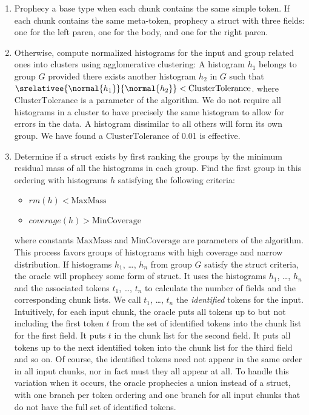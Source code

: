 \begin {enumerate}
\item Prophecy a base type when each chunk contains the same simple
  token. If each chunk contains the same meta-token, prophecy a struct
  with three fields: one for the left paren, one for the body, and one
  for the right paren.

\item Otherwise, compute normalized histograms for the input and group
  related ones into clusters using agglomerative clustering:  A
  histogram $h_1$ belongs to group $G$ provided there exists another
  histogram $h_2$ in $G$ such  that
  $\srelativee{\normal{h_1}}{\normal{h_2}} <  \mathrm{ClusterTolerance}$.  
  where $\mathrm{ClusterTolerance}$ is a parameter of the algorithm. We do not
  require all histograms in a cluster to 
  have precisely the same histogram to allow for errors in the data.
  A histogram dissimilar to all others will form its own group.
  We have found a $\mathrm{ClusterTolerance}$ of 0.01 is effective.  

\item Determine if a struct exists by first ranking the groups by the
  minimum residual mass of all the histograms in each group. Find the first group in this
  ordering with histograms $h$ satisfying the following criteria:
\begin {itemize}
\item $\mathit{rm}(h) < \mathrm{MaxMass}$
\item $\mathit{coverage}(h) > \mathrm{MinCoverage}$
\end{itemize}
where constants $\mathrm{MaxMass}$ and $\mathrm{MinCoverage}$ are
parameters of the algorithm.  
This process favors groups of histograms with high
coverage and narrow distribution.  
If histograms $h_1$, \ldots, $h_n$ from
group $G$ satisfy the struct criteria, the oracle will prophecy some
form of struct. It uses the histograms $h_1$, \ldots, $h_n$ and the associated
tokens $t_1$, \ldots, $t_n$ to calculate the number of fields and the
corresponding chunk lists.  We call $t_1$, \ldots, $t_n$ the {\em
  identified} tokens for the input.
Intuitively, for each input chunk, the oracle puts
all tokens up to but not including the first token $t$ from the set of
identified tokens into the chunk list for the first field.  It puts $t$ in
the chunk list for the second field. It puts all tokens up to the next
identified token into the chunk list for the third field and so on. Of
course, the identified tokens need not appear in the same order in all
input chunks, nor in fact must they all appear at all.  To handle
this variation when it occurs, the oracle prophecies a union instead
of a struct, with one branch per token ordering and one branch for all
input chunks that do not have the full set of identified tokens.



\end{enumerate}
